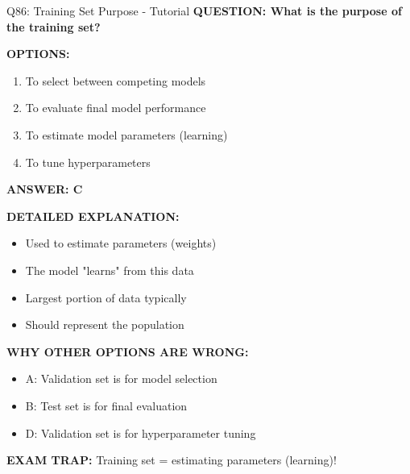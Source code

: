 \documentclass[8pt]{beamer}
\begin{document}
	
	\begin{frame}{Q86: Training Set Purpose - Tutorial}
		\fontsize{6.5}{7.5}\selectfont
		\textbf{QUESTION: What is the purpose of the training set?}
		
		\vspace{0.1cm}
		\textbf{OPTIONS:}
		\begin{enumerate}
			\item To select between competing models
			\item To evaluate final model performance
			\item To estimate model parameters (learning)
			\item To tune hyperparameters
		\end{enumerate}
		
		\vspace{0.1cm}
		\textcolor{myblue}{\textbf{ANSWER: C}}
		
		\vspace{0.1cm}
		\textbf{DETAILED EXPLANATION:}
		\begin{itemize}
			\item Used to estimate parameters (weights)
			\item The model "learns" from this data
			\item Largest portion of data typically
			\item Should represent the population
		\end{itemize}
		
		\vspace{0.1cm}
		\textcolor{myred}{\textbf{WHY OTHER OPTIONS ARE WRONG:}}
		\begin{itemize}
			\item \textcolor{myred}{A:} Validation set is for model selection
			\item \textcolor{myred}{B:} Test set is for final evaluation
			\item \textcolor{myred}{D:} Validation set is for hyperparameter tuning
		\end{itemize}
		
		\textcolor{myred}{\textbf{EXAM TRAP:}} Training set = \textcolor{myblue}{estimating parameters (learning)}!
	\end{frame}
	
\end{document}
